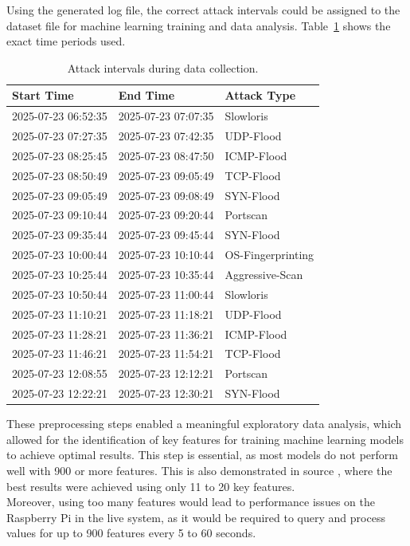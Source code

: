 Using the generated log file, the correct attack intervals could be assigned to the dataset file for machine learning training and data analysis.  
Table~\ref{tab:intervals} shows the exact time periods used.

\begin{table}[H]
\centering
\begin{tabular}{|l|l|l|}
\hline
\textbf{Start Time} & \textbf{End Time} & \textbf{Attack Type} \\
\hline
2025-07-23 06:52:35 & 2025-07-23 07:07:35 & Slowloris \\
2025-07-23 07:27:35 & 2025-07-23 07:42:35 & UDP-Flood \\
2025-07-23 08:25:45 & 2025-07-23 08:47:50 & ICMP-Flood \\
2025-07-23 08:50:49 & 2025-07-23 09:05:49 & TCP-Flood \\
2025-07-23 09:05:49 & 2025-07-23 09:08:49 & SYN-Flood \\
2025-07-23 09:10:44 & 2025-07-23 09:20:44 & Portscan \\
2025-07-23 09:35:44 & 2025-07-23 09:45:44 & SYN-Flood \\
2025-07-23 10:00:44 & 2025-07-23 10:10:44 & OS-Fingerprinting \\
2025-07-23 10:25:44 & 2025-07-23 10:35:44 & Aggressive-Scan \\
2025-07-23 10:50:44 & 2025-07-23 11:00:44 & Slowloris \\
2025-07-23 11:10:21 & 2025-07-23 11:18:21 & UDP-Flood \\
2025-07-23 11:28:21 & 2025-07-23 11:36:21 & ICMP-Flood \\
2025-07-23 11:46:21 & 2025-07-23 11:54:21 & TCP-Flood \\
2025-07-23 12:08:55 & 2025-07-23 12:12:21 & Portscan \\
2025-07-23 12:22:21 & 2025-07-23 12:30:21 & SYN-Flood \\
\hline
\end{tabular}
\caption{Attack intervals during data collection.}
\label{tab:intervals}
\end{table}

These preprocessing steps enabled a meaningful exploratory data analysis, which allowed for the identification of key features for training machine learning models to achieve optimal results.  
This step is essential, as most models do not perform well with 900 or more features. This is also demonstrated in source \cite{EV_Security}, where the best results were achieved using only 11 to 20 key features. \\

Moreover, using too many features would lead to performance issues on the Raspberry Pi in the live system, as it would be required to query and process values for up to 900 features every 5 to 60 seconds.


